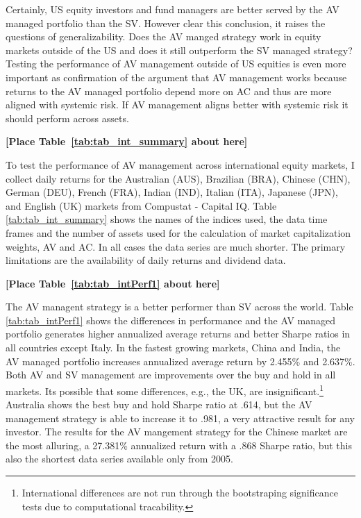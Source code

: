 Certainly, US equity investors and fund managers are better served by the AV managed portfolio than the SV. However clear this conclusion, it raises the questions of generalizability. Does the AV manged strategy work in equity markets outside of the US and does it still outperform the SV managed strategy? Testing the performance of AV management outside of US equities is even more important as confirmation of the argument that AV management works because returns to the AV managed portfolio depend more on AC and thus are more aligned with systemic risk. If AV management aligns better with systemic risk it should perform across assets.

\bigskip
\centerline{\bf [Place Table~\ref{tab:tab_int_summary} about here]}
\bigskip

To test the performance of AV management across international equity markets, I collect daily returns for the Australian (AUS), Brazilian (BRA), Chinese (CHN), German (DEU), French (FRA), Indian (IND), Italian (ITA), Japanese (JPN), and English (UK) markets from Compustat - Capital IQ. Table \ref{tab:tab_int_summary} shows the names of the indices used, the data time frames and the number of assets used for the calculation of market capitalization weights, AV and AC. In all cases the data series are much shorter. The primary limitations are the availability of daily returns and dividend data.

\bigskip
\centerline{\bf [Place Table~\ref{tab:tab_intPerf1} about here]}
\bigskip

The AV managent strategy is a better performer than SV across the world. Table \ref{tab:tab_intPerf1} shows the differences in performance and the AV managed portfolio generates higher annualized average returns and better Sharpe ratios in all countries except Italy. In the fastest growing markets, China and India, the AV managed portfolio increases annualized average return by 2.455\% and 2.637\%. Both AV and SV management are improvements over the buy and hold in all markets. Its possible that some differences, e.g., the UK, are insignificant.\footnote{International differences are not run through the bootstraping significance tests due to computational tracability.} Australia shows the best buy and hold Sharpe ratio at .614, but the AV management strategy is able to increase it to .981, a very attractive result for any investor. The results for the AV mangement strategy for the Chinese market are the most alluring, a 27.381\% annualized return with a .868 Sharpe ratio, but this also the shortest data series available only from 2005. 

